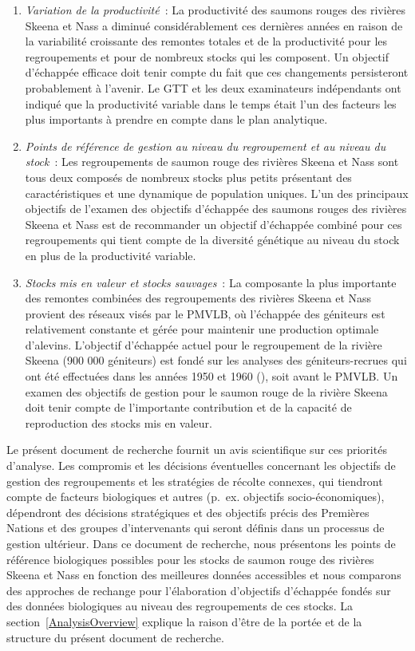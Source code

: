 \documentclass[french,11pt]{book}
\begin{document}
\begin{itemize}
\begin{enumerate}
  \item
    \emph{Variation de la productivité}~: La productivité des saumons rouges des rivières Skeena et Nass a diminué considérablement ces dernières années en raison de la variabilité croissante des remontes totales et de la productivité pour les regroupements et pour de nombreux stocks qui les composent. Un objectif d'échappée efficace doit tenir compte du fait que ces changements persisteront probablement à l'avenir. Le GTT et les deux examinateurs indépendants ont indiqué que la productivité variable dans le temps était l'un des facteurs les plus importants à prendre en compte dans le plan analytique.
  \item
    \emph{Points de référence de gestion au niveau du regroupement et au niveau du stock}~: Les regroupements de saumon rouge des rivières Skeena et Nass sont tous deux composés de nombreux stocks plus petits présentant des caractéristiques et une dynamique de population uniques. L'un des principaux objectifs de l'examen des objectifs d'échappée des saumons rouges des rivières Skeena et Nass est de recommander un objectif d'échappée combiné pour ces regroupements qui tient compte de la diversité génétique au niveau du stock en plus de la productivité variable.
  \item
    \emph{Stocks mis en valeur et stocks sauvages}~: La composante la plus importante des remontes combinées des regroupements des rivières Skeena et Nass provient des réseaux visés par le PMVLB, où l'échappée des géniteurs est relativement constante et gérée pour maintenir une production optimale d'alevins. L'objectif d'échappée actuel pour le regroupement de la rivière Skeena (900 000 géniteurs) est fondé sur les analyses des géniteurs-recrues qui ont été effectuées dans les années 1950 et 1960 (), soit avant le PMVLB. Un examen des objectifs de gestion pour le saumon rouge de la rivière Skeena doit tenir compte de l'importante contribution et de la capacité de reproduction des stocks mis en valeur.
  \end{enumerate}
\end{itemize}
Le présent document de recherche fournit un avis scientifique sur ces priorités d'analyse. Les compromis et les décisions éventuelles concernant les objectifs de gestion des regroupements et les stratégies de récolte connexes, qui tiendront compte de facteurs biologiques et autres (p.~ex. objectifs socio-économiques), dépendront des décisions stratégiques et des objectifs précis des Premières Nations et des groupes d'intervenants qui seront définis dans un processus de gestion ultérieur. Dans ce document de recherche, nous présentons les points de référence biologiques possibles pour les stocks de saumon rouge des rivières Skeena et Nass en fonction des meilleures données accessibles et nous comparons des approches de rechange pour l'élaboration d'objectifs d'échappée fondés sur des données biologiques au niveau des regroupements de ces stocks. La section~\ref{AnalysisOverview} explique la raison d'être de la portée et de la structure du présent document de recherche.
\end{document}
